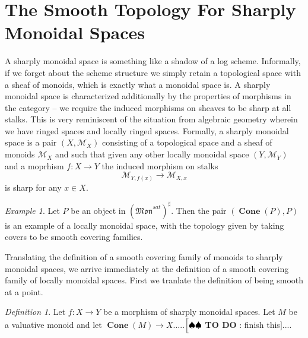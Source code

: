 \documentclass[12pt]{amsart}
\numberwithin{equation}{section}
\theoremstyle{plain}
\theoremstyle{remark}
\newtheorem{exm}[equation]{Example}
\newtheorem{defn}[equation]{Definition}
\newcommand{\todo}[1]{$\Bigl[ \spadesuit\spadesuit$ \textsf{{\bf TO DO} : #1}$\Bigr]$}
\DeclareMathOperator{\Cone}{\textbf{Cone}}
\newcommand{\Mon}{\mathfrak{Mon}}
\newcommand{\calM}{\mathcal{M}}
\begin{document}
\section{The Smooth Topology For Sharply Monoidal Spaces}
	A sharply monoidal space is something like a shadow of a log scheme. Informally, if we forget about the scheme structure we simply retain a topological space with a sheaf of monoids, which is exactly what a monoidal space is. A sharply monoidal space is characterized additionally by the properties of morphisms in the category -- we require the induced morphisms on sheaves to be sharp at all stalks. This is very reminiscent of the situation from algebraic geometry wherein we have ringed spaces and locally ringed spaces. Formally, a sharply monoidal space is a pair $(X, \calM_X)$ consisting of a topological space and a sheaf of monoids $\calM_X$ and such that given any other locally monoidal space $(Y, \calM_Y)$ and a moprhism $f:X\to Y$ the induced morphism on stalks
		$$\calM_{Y, f(x)}\to \calM_{X,x}$$
is sharp for any $x\in X$.
\begin{exm}
	Let $P$ be an object in $(\Mon^{sat})^{\sharp}$. Then the pair $(\Cone(P), P)$ is an example of a locally monoidal space, with the topology given by taking covers to be smooth covering families. 
\end{exm}
Translating the definition of a smooth covering family of monoids to sharply monoidal spaces, we arrive immediately at the definition of a smooth covering family of locally monoidal spaces. First we tranlate the definition of being smooth at a point.
\begin{defn}
	Let $f: X\to Y$ be a morphism of sharply monoidal spaces. Let $M$ be a valuative monoid and let $\Cone(M)\to X$.....\todo{finish this}....
\end{defn}	
\end{document}
